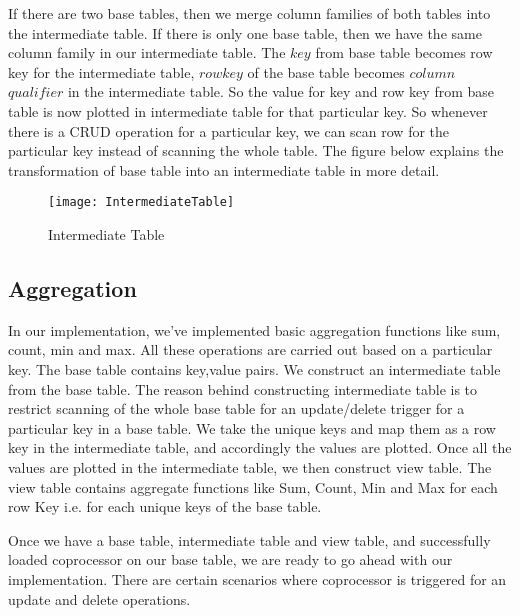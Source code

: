 \documentclass[11pt,a4paper,bibtotoc,idxtotoc,headsepline,footsepline,footexclude,BCOR12mm,DIV13]{scrbook}
\begin{document}
If there are two base tables, then we merge column families of both tables into the intermediate table. If there is only one base table, then we have the same column family in our intermediate table. The $key$ from base table becomes row key for the intermediate table, $row key$ of the base table becomes $column$ $qualifier$ in the intermediate table. So the value for key and row key from base table is now plotted in intermediate table for that particular key. So whenever there is a CRUD operation for a particular key, we can scan row for the particular key instead of scanning the whole table. The figure below explains the transformation of base table into an intermediate table in more detail. 

\begin{figure}
    \centering
    \texttt{[image: IntermediateTable]}
    \caption{Intermediate Table}
    
\end{figure}

\newpage
\subsection{Aggregation}
\label{sec:aggregationImpl}

In our implementation, we've implemented basic aggregation functions like sum, count, min and max. All these operations are carried out based on a particular key. The base table contains key,value pairs. We construct an intermediate table from the base table. The reason behind constructing intermediate table is to restrict scanning of the whole base table for an update/delete trigger for a particular key in a base table. We take the unique keys and map them as a row key in the intermediate table, and accordingly the values are plotted. Once all the values are plotted in the intermediate table, we then construct view table. The view table contains aggregate functions like Sum, Count, Min and Max for each row Key i.e. for each unique keys of the base table. 


    

Once we have a base table, intermediate table and view table, and successfully loaded coprocessor on our base table, we are ready to go ahead with our implementation. There are certain scenarios where coprocessor is triggered for an update and delete operations.
\end{document}
